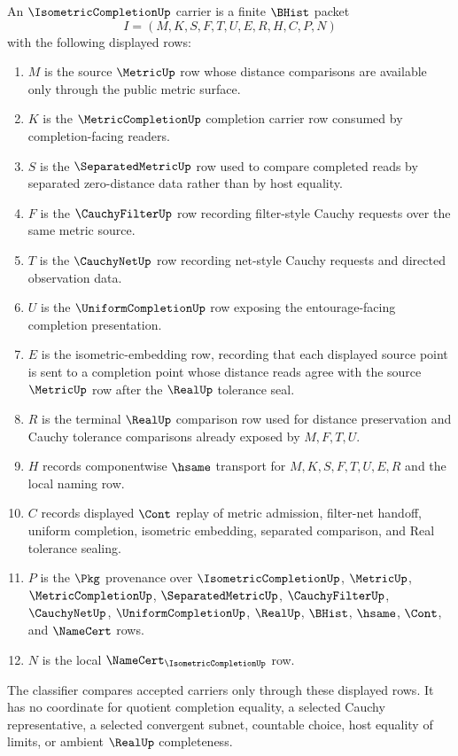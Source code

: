 \begin{definition}
\label{def:isometric-completion-carrier}
An $\IsometricCompletionUp$ carrier is a finite $\BHist$ packet
$$
I=(M,K,S,F,T,U,E,R,H,C,P,N)
$$
with the following displayed rows:
\begin{enumerate}
\item $M$ is the source $\MetricUp$ row whose distance comparisons are available only through the public metric surface.
\item $K$ is the $\MetricCompletionUp$ completion carrier row consumed by completion-facing readers.
\item $S$ is the $\SeparatedMetricUp$ row used to compare completed reads by separated zero-distance data rather than by host equality.
\item $F$ is the $\CauchyFilterUp$ row recording filter-style Cauchy requests over the same metric source.
\item $T$ is the $\CauchyNetUp$ row recording net-style Cauchy requests and directed observation data.
\item $U$ is the $\UniformCompletionUp$ row exposing the entourage-facing completion presentation.
\item $E$ is the isometric-embedding row, recording that each displayed source point is sent to a completion point whose distance reads agree with the source $\MetricUp$ row after the $\RealUp$ tolerance seal.
\item $R$ is the terminal $\RealUp$ comparison row used for distance preservation and Cauchy tolerance comparisons already exposed by $M,F,T,U$.
\item $H$ records componentwise $\hsame$ transport for $M,K,S,F,T,U,E,R$ and the local naming row.
\item $C$ records displayed $\Cont$ replay of metric admission, filter-net handoff, uniform completion, isometric embedding, separated comparison, and Real tolerance sealing.
\item $P$ is the $\Pkg$ provenance over $\IsometricCompletionUp$, $\MetricUp$, $\MetricCompletionUp$, $\SeparatedMetricUp$, $\CauchyFilterUp$, $\CauchyNetUp$, $\UniformCompletionUp$, $\RealUp$, $\BHist$, $\hsame$, $\Cont$, and $\NameCert$ rows.
\item $N$ is the local $\NameCert_{\IsometricCompletionUp}$ row.
\end{enumerate}
The classifier compares accepted carriers only through these displayed rows. It has no coordinate for quotient completion equality, a selected Cauchy representative, a selected convergent subnet, countable choice, host equality of limits, or ambient $\RealUp$ completeness.
\end{definition}

